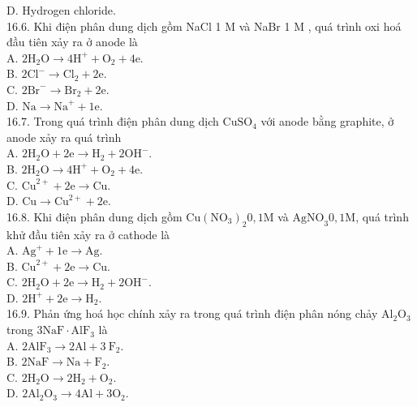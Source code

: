 \documentclass[10pt]{article}
\begin{document}
D. Hydrogen chloride.\\
16.6. Khi điện phân dung dịch gồm NaCl 1 M và NaBr 1 M , quá trình oxi hoá đầu tiên xảy ra ở anode là\\
A. $2 \mathrm{H}_{2} \mathrm{O} \rightarrow 4 \mathrm{H}^{+}+\mathrm{O}_{2}+4 \mathrm{e}$.\\
B. $2 \mathrm{Cl}^{-} \rightarrow \mathrm{Cl}_{2}+2 \mathrm{e}$.\\
C. $2 \mathrm{Br}^{-} \rightarrow \mathrm{Br}_{2}+2 \mathrm{e}$.\\
D. $\mathrm{Na} \rightarrow \mathrm{Na}^{+}+1 \mathrm{e}$.\\
16.7. Trong quá trình điện phân dung dịch $\mathrm{CuSO}_{4}$ với anode bằng graphite, ở anode xảy ra quá trình\\
A. $2 \mathrm{H}_{2} \mathrm{O}+2 \mathrm{e} \rightarrow \mathrm{H}_{2}+2 \mathrm{OH}^{-}$.\\
B. $2 \mathrm{H}_{2} \mathrm{O} \rightarrow 4 \mathrm{H}^{+}+\mathrm{O}_{2}+4 \mathrm{e}$.\\
C. $\mathrm{Cu}^{2+}+2 \mathrm{e} \rightarrow \mathrm{Cu}$.\\
D. $\mathrm{Cu} \rightarrow \mathrm{Cu}^{2+}+2 \mathrm{e}$.\\
16.8. Khi điện phân dung dịch gồm $\mathrm{Cu}\left(\mathrm{NO}_{3}\right)_{2} 0,1 \mathrm{M}$ và $\mathrm{AgNO}_{3} 0,1 \mathrm{M}$, quá trình khử đầu tiên xảy ra ở cathode là\\
A. $\mathrm{Ag}^{+}+1 \mathrm{e} \rightarrow \mathrm{Ag}$.\\
B. $\mathrm{Cu}^{2+}+2 \mathrm{e} \rightarrow \mathrm{Cu}$.\\
C. $2 \mathrm{H}_{2} \mathrm{O}+2 \mathrm{e} \rightarrow \mathrm{H}_{2}+2 \mathrm{OH}^{-}$.\\
D. $2 \mathrm{H}^{+}+2 \mathrm{e} \rightarrow \mathrm{H}_{2}$.\\
16.9. Phản ứng hoá học chính xảy ra trong quá trình điện phân nóng chảy $\mathrm{Al}_{2} \mathrm{O}_{3}$ trong $3 \mathrm{NaF} \cdot \mathrm{AlF}_{3}$ là\\
A. $2 \mathrm{AlF}_{3} \longrightarrow 2 \mathrm{Al}+3 \mathrm{~F}_{2}$.\\
B. $2 \mathrm{NaF} \longrightarrow \mathrm{Na}+\mathrm{F}_{2}$.\\
C. $2 \mathrm{H}_{2} \mathrm{O} \longrightarrow 2 \mathrm{H}_{2}+\mathrm{O}_{2}$.\\
D. $2 \mathrm{Al}_{2} \mathrm{O}_{3} \longrightarrow 4 \mathrm{Al}+3 \mathrm{O}_{2}$.\\
\end{document}
